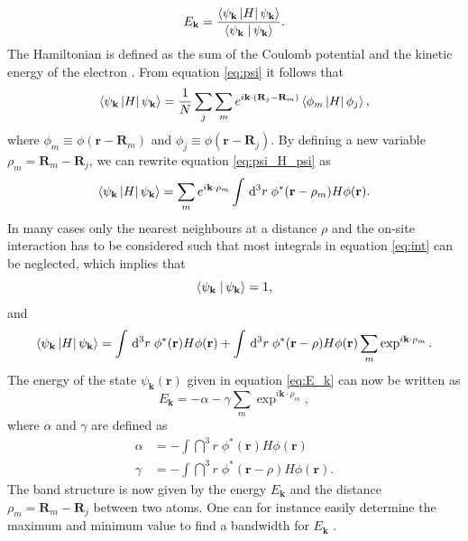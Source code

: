 \begin{equation}\label{eq:E_k}
    E_\mathbf{k}=\frac{\left\langle\psi_\mathbf{k}\left|H\right|\psi_\mathbf{k}\right\rangle}{\left\langle\psi_\mathbf{k}\left.\right|\psi_\mathbf{k}\right\rangle}.
\end{equation}
The Hamiltonian is defined as the sum of the Coulomb potential and the kinetic energy of the electron \cite{Griffiths2018}. From equation \ref{eq:psi} it follows that \cite{Kittel2004}
\begin{equation}\label{eq:psi_H_psi}
    \left\langle\psi_\mathbf{k}\left|H\right|\psi_\mathbf{k}\right\rangle = \frac{1}{N}\sum_j\sum_me^{i\mathbf{k}\cdot(\mathbf{R}_j-\mathbf{R}_m)}\left\langle\phi_m\left|H\right|\phi_j\right\rangle,
\end{equation}
where $\phi_m \equiv \phi(\mathbf{r}-\mathbf{R}_m)$ and $\phi_j \equiv \phi(\mathbf{r}-\mathbf{R}_j)$. By defining a new variable $\rho_m = \mathbf{R}_m - \mathbf{R}_j$, we can rewrite equation \ref{eq:psi_H_psi} as \cite{Kittel2004}
\begin{equation}\label{eq:int}
    \left\langle\psi_\mathbf{k}\left|H\right|\psi_\mathbf{k}\right\rangle = \sum_me^{i\mathbf{k}\cdot\rho_m} \int \,\mathrm{d}^3 r \; \phi^*(\mathbf{r}-\rho_m)H\phi(\mathbf{r}).
\end{equation}
In many cases only the nearest neighbours at a distance $\rho$ and the on-site interaction has to be considered such that most integrals in equation \ref{eq:int} can be neglected, which implies that \cite{Kittel2004}
\begin{equation}
    \left\langle\psi_\mathbf{k}\left.\right|\psi_\mathbf{k}\right\rangle = 1,
\end{equation}
and
\begin{equation}
    \left\langle\psi_\mathbf{k}\left|H\right|\psi_\mathbf{k}\right\rangle = \int \,\mathrm{d}^3 r \; \phi^*(\mathbf{r})H\phi(\mathbf{r})+ \int \,\mathrm{d}^3 r \; \phi^*(\mathbf{r}-\rho)H\phi(\mathbf{r}) \sum_m\exp^{i\mathbf{k}\cdot\rho_m}.
\end{equation}
The energy of the state $\psi_\mathbf{k}(\mathbf{r})$ given in equation \ref{eq:E_k} can now be written as
\begin{equation}
    E_\mathbf{k} = -\alpha-\gamma \sum_m\exp^{i\mathbf{k}\cdot\rho_m},
\end{equation}
where $\alpha$ and $\gamma$ are defined as \cite{Kittel2004}
\begin{equation}
\begin{split}
    \alpha &= - \int \dint^3 r \; \phi^*(\mathbf{r})H\phi(\mathbf{r})\\
    \gamma &= - \int \dint^3 r \; \phi^*(\mathbf{r}-\rho)H\phi(\mathbf{r}).
\end{split}
\end{equation}
The band structure is now given by the energy $E_\mathbf{k}$ and the distance $\rho_m = \mathbf{R}_m - \mathbf{R}_j$ between two atoms. One can for instance easily determine the maximum and minimum value to find a bandwidth for $E_\mathbf{k}$ \cite{Quinn2018}.


